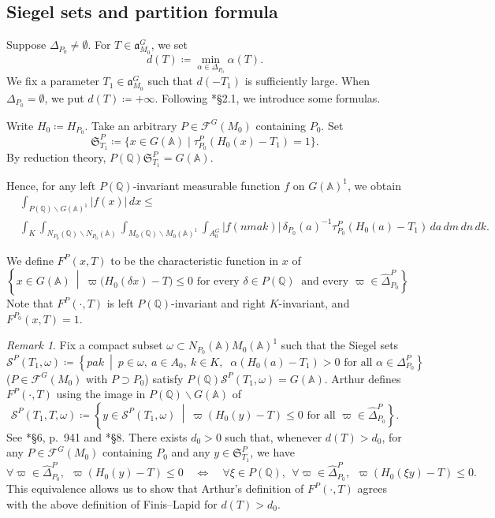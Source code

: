 \documentclass[12pt]{amsart}
\theoremstyle{definition}
\theoremstyle{plain}
\theoremstyle{remark}
\newtheorem{remark}[definition]{Remark}
\def\Q{\mathbb{Q}}%
\def\A{\mathbb{A}}%
\def\inf{\infty}
\def\bs{\backslash}%
\newcommand{\fa}{\mathfrak{a}}
\newcommand{\fS}{\mathfrak{S}}
\newcommand{\cF}{\mathcal{F}}
\newcommand{\cS}{\mathcal{S}}
\numberwithin{equation}{section}
\begin{document}
\subsection{Siegel sets and partition formula}

Suppose $\Delta_{P_0}\neq \emptyset$. 
For $T\in \fa_{M_0}^G$, we set
\[
d(T)\coloneqq \min_{\alpha\in\Delta_{P_0}} \alpha(T).
\]
We fix a parameter $T_1\in\fa_{M_0}^G$ such that $d(-T_1)$ is sufficiently large. 
When $\Delta_{P_0}=\emptyset$, we put $d(T)\coloneqq+\inf$.
Following \cite{FL16}*{\S2.1}, we introduce some formulas. 


Write $H_0\coloneqq H_{P_0}$.
Take an arbitrary $P\in\cF^G(M_0)$ containing $P_0$.
Set 
\[
\fS_{T_1}^P\coloneqq\{x\in G(\A)\mid\tau_{P_0}^P(H_0(x)-T_1)=1\}. 
\]
By reduction theory, $P(\Q)\fS_{T_1}^P=G(\A)$.

Hence, for any left $P(\Q)$-invariant measurable function $f$ on $G(\A)^1$, 
we obtain\begin{align}
&    \int_{P(\Q)\bs G(\A)^1}|f(x)|\, dx \le \\
&    \int_{K}\int_{N_{P_0}(\Q)\bs N_{P_0}(\A)} \int_{M_0(\Q)\bs M_0(\A)^1}\int_{A_0^G} |f(nmak)|\, \delta_{P_0}(a)^{-1} \tau_{P_0}^P(H_0(a)-T_1) \, da\, dm \, dn \, dk .\nonumber
\end{align}
\fi

We define $F^P(x,T)$ to be the characteristic function in $x$ of
    \[
  \left\{x\in G(\A)\ \middle|\
      \varpi\bigl(H_0(\delta x)-T\bigr)\leq 0
      \text{ for every }\delta\in P(\Q) \;\; 
      \text{and every }\varpi\in\widehat\Delta_{P_0}^P
  \right\}.  
    \]
Note that $F^P(\cdot,T)$ is left $P(\Q)$-invariant and right
$K$-invariant, and $F^{P_0}(x,T)=1$.  
\begin{remark}
\label{rem:truncation-Arthur-compatibility}
Fix a compact subset $\omega\subset N_{P_0}(\A)M_0(\A)^1$ such that
the Siegel sets
\[
  \cS^P(T_1,\omega)
  \coloneqq
  \left\{pak\ \middle|\
      p\in\omega,\ a\in A_0,\ k\in K,\;\; 
      \alpha(H_0(a)-T_1)>0
      \text{ for all }\alpha\in\Delta_{P_0}^P
  \right\}
\]
($P\in\cF^G(M_0)$ with $P\supset P_0$) satisfy $P(\Q)\cS^P(T_1,\omega)=G(\A)$.
Arthur defines $F^P(\cdot,T)$ using the image in
$P(\Q)\backslash G(\A)$ of
\begin{equation*}
  \cS^P(T_1,T,\omega)
  \coloneqq
  \left\{y\in\cS^P(T_1,\omega)\ \middle|\
    \varpi(H_0(y)-T)\leq0
    \text{ for all }\varpi\in\widehat\Delta_{P_0}^P
  \right\}.
\end{equation*}
See \cite{Art78}*{\S6, p.~941} and \cite{Art05}*{\S8}.
There exists $d_0>0$ such that, whenever
$d(T)>d_0$, for any $P\in\cF^G(M_0)$ containing $P_0$ and any $y\in \fS_{T_1}^P$, we have
\[
\forall \varpi\in\widehat\Delta_{P_0}^P, \ \  \varpi(H_0(y)-T)\leq0  \quad\Longleftrightarrow
  \quad \forall \xi\in P(\Q),\ \  \forall\varpi\in\widehat\Delta_{P_0}^P, \ \ \varpi(H_0(\xi y)-T)\leq 0.
\]
This equivalence allows us to show that Arthur's definition of $F^P(\cdot,T)$ agrees with the above definition of Finis--Lapid for $d(T)>d_0$.
\end{remark}
\end{document}
